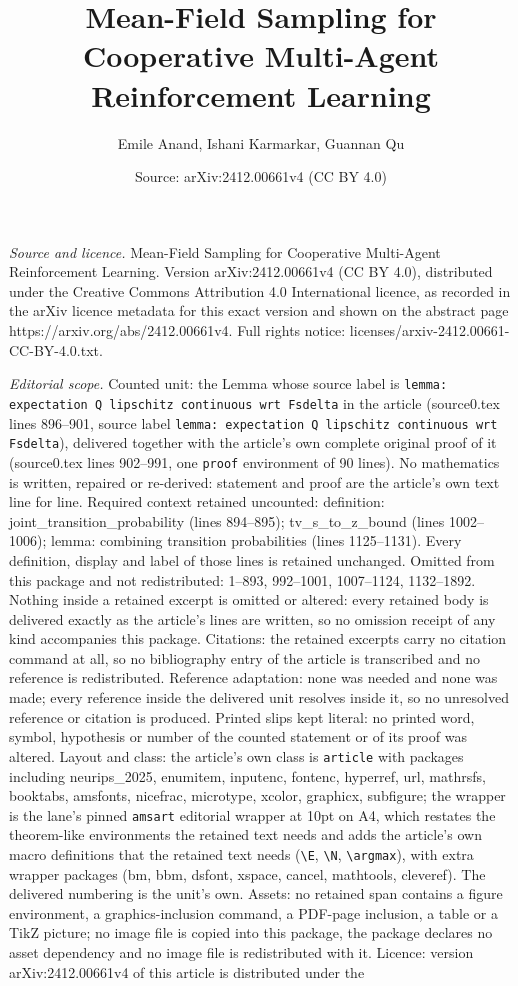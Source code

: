 \documentclass[10pt,a4paper]{amsart}
\title[Mean-Field Sampling for Cooperative Multi-Agent Reinforcemen]{Mean-Field Sampling for Cooperative Multi-Agent Reinforcement Learning}
\author{Emile Anand, Ishani Karmarkar, Guannan Qu}
\date{Source: arXiv:2412.00661v4 (CC BY 4.0)}
\begin{document}
\maketitle

\noindent\emph{Source and licence.} Mean-Field Sampling for Cooperative Multi-Agent Reinforcement Learning. Version arXiv:2412.00661v4 (CC BY 4.0), distributed under the Creative Commons Attribution 4.0 International licence, as recorded in the arXiv licence metadata for this exact version and shown on the abstract page https://arxiv.org/abs/2412.00661v4. Full rights notice: licenses/arxiv-2412.00661-CC-BY-4.0.txt.\par\smallskip

\noindent\textit{Editorial scope.} Counted unit: the Lemma whose source label is \texttt{lemma: expectation Q lipschitz continuous wrt Fsdelta} in the article (source0.tex lines 896--901, source label \texttt{lemma: expectation Q lipschitz continuous wrt Fsdelta}), delivered together with the article's own complete original proof of it (source0.tex lines 902--991, one \texttt{proof} environment of 90 lines). No mathematics is written, repaired or re-derived: statement and proof are the article's own text line for line. Required context retained uncounted: definition: joint\_transition\_probability (lines 894--895); tv\_s\_to\_z\_bound (lines 1002--1006); lemma: combining transition probabilities (lines 1125--1131). Every definition, display and label of those lines is retained unchanged. Omitted from this package and not redistributed: 1--893, 992--1001, 1007--1124, 1132--1892. Nothing inside a retained excerpt is omitted or altered: every retained body is delivered exactly as the article's lines are written, so no omission receipt of any kind accompanies this package. Citations: the retained excerpts carry no citation command at all, so no bibliography entry of the article is transcribed and no reference is redistributed. Reference adaptation: none was needed and none was made; every reference inside the delivered unit resolves inside it, so no unresolved reference or citation is produced. Printed slips kept literal: no printed word, symbol, hypothesis or number of the counted statement or of its proof was altered. Layout and class: the article's own class is \texttt{article} with packages including neurips\_2025, enumitem, inputenc, fontenc, hyperref, url, mathrsfs, booktabs, amsfonts, nicefrac, microtype, xcolor, graphicx, subfigure; the wrapper is the lane's pinned \texttt{amsart} editorial wrapper at 10pt on A4, which restates the theorem-like environments the retained text needs and adds the article's own macro definitions that the retained text needs (\texttt{\textbackslash E}, \texttt{\textbackslash N}, \texttt{\textbackslash argmax}), with extra wrapper packages (bm, bbm, dsfont, xspace, cancel, mathtools, cleveref). The delivered numbering is the unit's own. Assets: no retained span contains a figure environment, a graphics-inclusion command, a PDF-page inclusion, a table or a TikZ picture; no image file is copied into this package, the package declares no asset dependency and no image file is redistributed with it. Licence: version arXiv:2412.00661v4 of this article is distributed under the 
\end{document}
